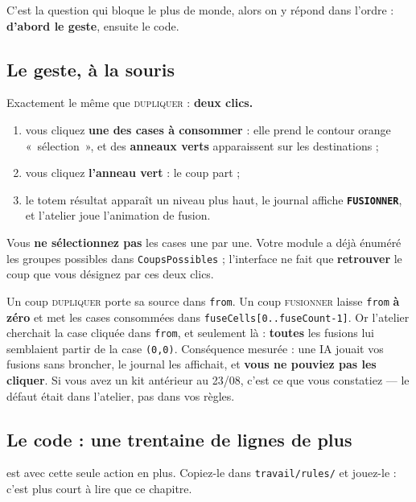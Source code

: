 C'est la question qui bloque le plus de monde, alors on y répond dans l'ordre :
\textbf{d'abord le geste}, ensuite le code.

\subsection*{Le geste, à la souris}

Exactement le même que \textsc{dupliquer} : \textbf{deux clics.}

\begin{enumerate}
  \item vous cliquez \textbf{une des cases à consommer} : elle prend le contour
        orange «~sélection~», et des \textbf{anneaux verts} apparaissent sur les
        destinations ;
  \item vous cliquez \textbf{l'anneau vert} : le coup part ;
  \item le totem résultat apparaît un niveau plus haut, le journal affiche
        \textbf{\texttt{FUSIONNER}}, et l'atelier joue l'animation de fusion.
\end{enumerate}

Vous \textbf{ne sélectionnez pas} les cases une par une. Votre module a déjà
énuméré les groupes possibles dans \texttt{CoupsPossibles} ; l'interface ne fait
que \textbf{retrouver} le coup que vous désignez par ces deux clics.

\begin{nkpiege}
Un coup \textsc{dupliquer} porte sa source dans \texttt{from}. Un coup
\textsc{fusionner} laisse \texttt{from} \textbf{à zéro} et met les cases
consommées dans \texttt{fuseCells[0..fuseCount-1]}. Or l'atelier cherchait la
case cliquée dans \texttt{from}, et seulement là : \textbf{toutes} les fusions
lui semblaient partir de la case \texttt{(0,0)}. Conséquence mesurée : une IA
jouait vos fusions sans broncher, le journal les affichait, et \textbf{vous ne
pouviez pas les cliquer}. Si vous avez un kit antérieur au 23/08, c'est ce que
vous constatiez --- le défaut était dans l'atelier, pas dans vos règles.
\end{nkpiege}

\subsection*{Le code : une trentaine de lignes de plus}

 est
 avec cette seule action en plus. Copiez-le dans
\texttt{travail/rules/} et jouez-le : c'est plus court à lire que ce chapitre.

